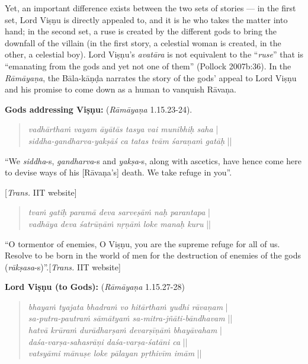 Yet, an important difference exists between the two sets of stories --- in the first set, Lord Viṣṇu is directly appealed to, and it is he who takes the matter into hand; in the second set, a ruse is created by the different gods to bring the downfall of the villain (in the first story, a celestial woman is created, in the other, a celestial boy). Lord Viṣṇu’s {\sl avatāra} is not equivalent to the “{\sl ruse}” that is “emanating from the gods and yet not one of them” (Pollock 2007b:36). In the {\sl Rāmāyaṇa}, the Bāla-kāṇḍa narrates the story of the gods’ appeal to Lord Viṣṇu and his promise to come down as a human to vanquish Rāvaṇa. 

\smallskip
\textbf{Gods addressing Viṣṇu:} ({\sl Rāmāyaṇa} 1.15.23-24).\\[-20pt]
\begin{quote}
{{\sl vadhārthaṁ vayam āyātās\label{verse1} tasya vai munibhiḥ saha}} |\\
{\sl siddha-gandharva-yakṣāś ca tatas tvām śaraṇaṁ gatāḥ} ||
\end{quote}

\begin{myquote}
“We {\sl siddha}-s, {\sl gandharva}-s and {\sl yakṣa}-s, along with ascetics, have hence come here to devise ways of his [Rāvaṇa’s] death. We take refuge in you”.

\hfill[{\sl Trans.} IIT website]
\end{myquote}
\begin{quote}
{{\sl tvaṁ gatiḥ paramā deva\label{verse2} sarveṣāṁ naḥ parantapa}} |\\
{\sl vadhāya deva śatrūṇāṁ nṛṇāṁ loke manaḥ kuru} ||
\end{quote}

\begin{myquote}
“O tormentor of enemies, O Viṣṇu, you are the supreme refuge for all of us. Resolve to be born in the world of men for the destruction of enemies of the gods ({\sl rākṣasa}-s)”.\hfill [{\sl Trans.} IIT website]
\end{myquote}

\newpage

\smallskip
\textbf{Lord Viṣṇu (to Gods):} ({\sl Rāmāyaṇa} 1.15.27-28)
\begin{quote}
{{\sl bhayaṁ tyajata bhadraṁ\label{verse3} vo hitārthaṁ yudhi rāvaṇam}} |\\
{\sl sa-putra-pautraṁ sāmātyaṁ sa-mitra-jñāti-bāndhavam} ||\\
{\sl hatvā krūraṁ durādharṣaṁ\label{verse4} devarṣīṇāṁ bhayāvaham} |\\
{\sl daśa-varṣa-sahasrāṇi daśa-varṣa-śatāni ca} ||\\
{\sl vatsyāmi mānuṣe loke pālayan pṛthivīm imām} ||
\end{quote}

